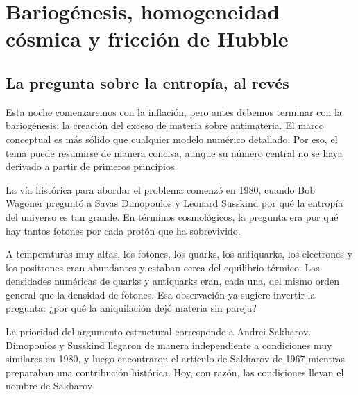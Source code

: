 \chapter{Bariogénesis, homogeneidad cósmica y fricción de Hubble}


\section{La pregunta sobre la entropía, al revés}

Esta noche comenzaremos con la inflación, pero antes debemos terminar con la bariogénesis: la creación del exceso de materia sobre antimateria. El marco conceptual es más sólido que cualquier modelo numérico detallado. Por eso, el tema puede resumirse de manera concisa, aunque su número central no se haya derivado a partir de primeros principios.

La vía histórica para abordar el problema comenzó en 1980, cuando Bob Wagoner preguntó a Savas Dimopoulos y Leonard Susskind por qué la entropía del universo es tan grande. En términos cosmológicos, la pregunta era por qué hay tantos fotones por cada protón que ha sobrevivido.

A temperaturas muy altas, los fotones, los quarks, los antiquarks, los electrones y los positrones eran abundantes y estaban cerca del equilibrio térmico. Las densidades numéricas de quarks y antiquarks eran, cada una, del mismo orden general que la densidad de fotones. Esa observación ya sugiere invertir la pregunta: ¿por qué la aniquilación dejó materia sin pareja?

La prioridad del argumento estructural corresponde a Andrei Sakharov. Dimopoulos y Susskind llegaron de manera independiente a condiciones muy similares en 1980, y luego encontraron el artículo de Sakharov de 1967 mientras preparaban una contribución histórica. Hoy, con razón, las condiciones llevan el nombre de Sakharov.

